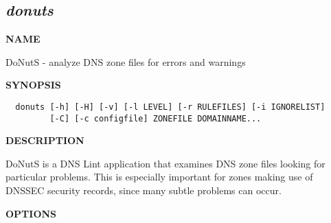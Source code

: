\clearpage

\subsection{\it donuts}

{\bf NAME}

DoNutS - analyze DNS zone files for errors and warnings

{\bf SYNOPSIS}

\begin{verbatim}
  donuts [-h] [-H] [-v] [-l LEVEL] [-r RULEFILES] [-i IGNORELIST]
         [-C] [-c configfile] ZONEFILE DOMAINNAME...
\end{verbatim}

{\bf DESCRIPTION}

DoNutS is a DNS Lint application that examines DNS zone files looking for
particular problems.  This is especially important for zones making use of
DNSSEC security records, since many subtle problems can occur.

{\bf OPTIONS}

